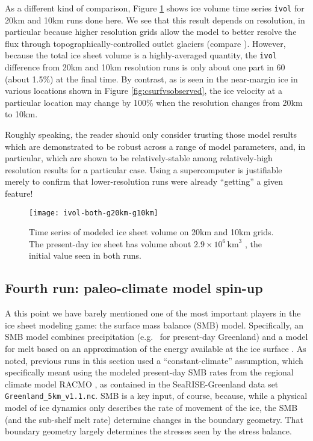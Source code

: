 As a different kind of comparison, Figure \ref{fig:ivolboth} shows ice volume time series \texttt{ivol} for 20km and 10km runs done here.  We see that this result depends on resolution, in particular because higher resolution grids allow the model to better resolve the flux through topographically-controlled outlet glaciers (compare \cite{Pfefferetal2008}).  However, because the total ice sheet volume is a highly-averaged quantity, the \texttt{ivol} difference from 20km and 10km resolution runs is only about one part in 60 (about 1.5\%) at the final time.  By contrast, as is seen in the near-margin ice in various locations shown in Figure \ref{fig:csurfvsobserved}, the ice velocity at a particular location may change by 100\% when the resolution changes from 20km to 10km.

Roughly speaking, the reader should only consider trusting those model results which are demonstrated to be robust across a range of model parameters, and, in particular, which are shown to be relatively-stable among relatively-high resolution results for a particular case.  Using a supercomputer is justifiable merely to confirm that lower-resolution runs were already ``getting'' a given feature!

\begin{figure}[ht]
\centering
\texttt{[image: ivol-both-g20km-g10km]}
\caption{Time series of modeled ice sheet volume on 20km and 10km grids.  The present-day ice sheet has volume about $2.9\times 10^6\,\text{km}^3$ \cite{BamberLayberryGogenini}, the initial value seen in both runs.}
\label{fig:ivolboth}
\end{figure}


\subsection{Fourth run: paleo-climate model spin-up}  \label{subsect:paleorun}  

A this point we have barely mentioned one of the most important players in the ice sheet modeling game: the surface mass balance (SMB) model.  Specifically, an SMB model combines precipitation (e.g.~\cite{Balesetal2001} for present-day Greenland) and a model for melt based on an approximation of the energy available at the ice surface \cite{Hock05}.  As noted, previous runs in this section used a ``constant-climate'' assumption, which specifically meant using the modeled present-day SMB rates from the regional climate model RACMO \cite{Ettemaetal2009}, as contained in the SeaRISE-Greenland data set \verb|Greenland_5km_v1.1.nc|.  SMB is a key input, of course, because, while a physical model of ice dynamics only describes the rate of movement of the ice, the SMB (and the sub-shelf melt rate) determine changes in the boundary geometry.  That boundary geometry largely determines the stresses seen by the stress balance.

